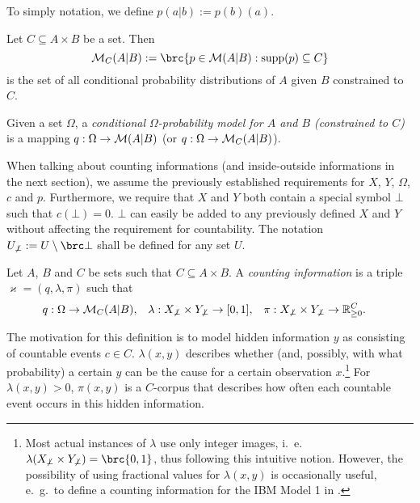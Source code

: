 To simply notation, we define $p(a|b) := p(b)(a)$.

\begin{definition}
 Let $C\subseteq A\times B$ be a set. Then
 \[
  \um_C(A|B) := \brc{p\in\um(A|B): \operatorname{supp}(p)\subseteq C}
 \]
 is the set of all conditional probability distributions of $A$ given $B$
 constrained to $C$.
\end{definition}

\begin{definition}
 Given a set $\Omega$, a \emph{conditional $\Omega$-probability model for $A$
 and $B$ (constrained to $C$)} is a mapping $q:\Omega\to\mathcal M(A|B)$ (or
 $q:\Omega\to\mathcal M_C(A|B)$).
\end{definition}

When talking about counting informations (and inside-outside informations in
the next section), we assume the previously established requirements for $X$,
$Y$, $\Omega$, $c$ and $p$. Furthermore, we require that $X$ and $Y$ both
contain a special symbol $\bot$ such that $c(\bot) = 0$. $\bot$ can easily be
added to any previously defined $X$ and $Y$ without affecting the requirement
for countability. The notation $U_{\not\bot} := U\setminus\brc\bot$ shall be
defined for any set $U$.

\begin{definition}
 Let $A$, $B$ and $C$ be sets such that $C\subseteq A\times B$. A
 \emph{counting information} is a triple $\varkappa = (q,\lambda,\pi)$ such
 that
 \begin{align*}
  q &: \Omega\to\mathcal M_C(A|B), &
  \lambda &: X_{\not\bot} \times Y_{\not\bot} \to [0,1], &
  \pi &: X_{\not\bot} \times Y_{\not\bot} \to \mathbb R_{\geq0}^C.
 \end{align*}
\end{definition}

The motivation for this definition is to model hidden information $y$ as
consisting of countable events $c\in C$. $\lambda(x,y)$ describes whether (and,
possibly, with what probability) a certain $y$ can be the cause for a certain
observation $x$.\footnote{Most actual instances of $\lambda$ use only integer
images, i.~e.~$\lambda(X_{\not\bot}\times Y_{\not\bot}) = \brc{0,1}$, thus
following this intuitive notion. However, the possibility of using fractional
values for $\lambda(x,y)$ is occasionally useful, e.~g.~to define a counting
information for the IBM Model 1 in \cite[pp.~23]{bucstuvog15}.} For
$\lambda(x,y)>0$, $\pi(x,y)$ is a $C$-corpus that describes how often each
countable event occurs in this hidden information.

